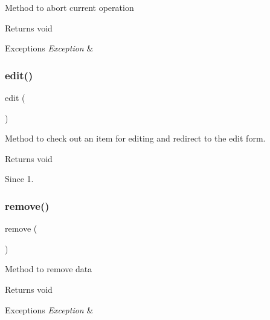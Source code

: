 Method to abort current operation

\begin{DoxyReturn}{Returns}
void
\end{DoxyReturn}

\begin{DoxyExceptions}{Exceptions}
{\em Exception} & \\
\hline
\end{DoxyExceptions}
\mbox{\label{classtks__agenda_controller_newsitem_form_a5cb75cbb16467eb1768837d126dc535b}} 
\subsubsection{edit()}
{\footnotesize\ttfamily edit (\begin{DoxyParamCaption}{ }\end{DoxyParamCaption})}

Method to check out an item for editing and redirect to the edit form.

\begin{DoxyReturn}{Returns}
void
\end{DoxyReturn}
\begin{DoxySince}{Since}
1. 
\end{DoxySince}
\mbox{\label{classtks__agenda_controller_newsitem_form_aff9a1fb07dca963c2c9a8ffe66b45ded}} 
\subsubsection{remove()}
{\footnotesize\ttfamily remove (\begin{DoxyParamCaption}{ }\end{DoxyParamCaption})}

Method to remove data

\begin{DoxyReturn}{Returns}
void
\end{DoxyReturn}

\begin{DoxyExceptions}{Exceptions}
{\em Exception} & \\
\hline
\end{DoxyExceptions}
\mbox{\label{classtks__agenda_controller_newsitem_form_afc8a3c62679cf00ade9f15fb2a6d6132}} 

